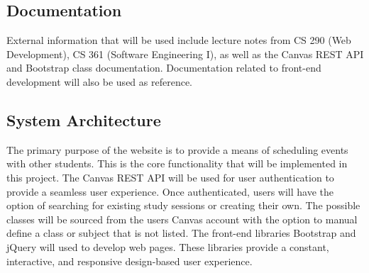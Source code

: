 \documentclass[12pt]{article}
\begin{document}
\subsection{Documentation}
External information that will be used include lecture notes from CS 290 (Web Development), CS 361 (Software Engineering I), as well as the Canvas REST API and Bootstrap class documentation. Documentation related to front-end development will also be used as reference.

\subsection{System Architecture}
The primary purpose of the website is to provide a means of scheduling events with other students. This is the core functionality that will be implemented in this project. 
The Canvas REST API will be used for user authentication to provide a seamless user experience. Once authenticated, users will have the option of searching for existing study sessions or creating their own. The possible classes will be sourced from the users Canvas account with the option to manual define a class or subject that is not listed.
The front-end libraries Bootstrap and jQuery will used to develop web pages. These libraries provide a constant, interactive, and responsive design-based user experience.


\end{document}
